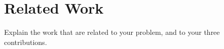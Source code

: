 \section{Related Work}

Explain the work that are related to your problem, and to your three contributions. 
